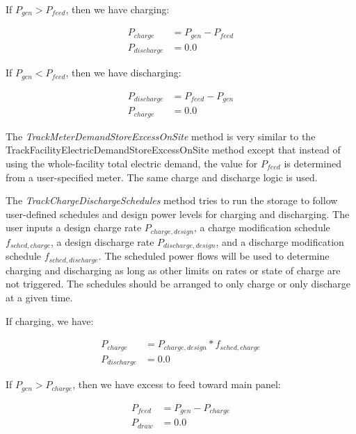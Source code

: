 If ${P_{gen}} > {P_{feed}}$,  then we have charging:

\begin{equation}
  \begin{array}{rl}
    {P_{charge}} &= {P_{gen}} - {P_{feed}} \\
    {P_{discharge}} &= 0.0
  \end{array}
\end{equation}

If ${P_{gen}} < {P_{feed}}$, then we have discharging:

\begin{equation}
  \begin{array}{rl}
    {P_{discharge}} &=  {P_{feed}} - {P_{gen}} \\
    {P_{charge}} &= 0.0
  \end{array}
\end{equation}

The \emph{TrackMeterDemandStoreExcessOnSite} method is very similar to the TrackFacilityElectricDemandStoreExcessOnSite method except that instead of using the whole-facility total electric demand, the value for ${P_{feed}}$ is determined from a user-specified meter.  The same charge and discharge logic is used.

The \emph{TrackChargeDischargeSchedules} method tries to run the storage to follow user-defined schedules and design power levels for charging and discharging.  The user inputs a design charge rate ${P_{charge,design}}$, a charge modification schedule ${f_{sched,charge}}$, a design discharge rate ${P_{discharge,design}}$, and a discharge modification schedule ${f_{sched,discharge}}$.  The scheduled power flows will be used to determine charging and discharging as long as other limits on rates or state of charge are not triggered.  The schedules should be arranged to only charge or only discharge at a given time.

If charging, we have:

\begin{equation}
  \begin{array}{rl}
    {P_{charge}} &= {P_{charge,design}} * {f_{sched,charge}} \\
    {P_{discharge}} &= 0.0
  \end{array}
\end{equation}

If ${P_{gen}} > {P_{charge}}$,  then we have excess to feed toward main panel:

\begin{equation}
  \begin{array}{rl}
    {P_{feed}} &= {P_{gen}} - {P_{charge}} \\
    {P_{draw}} &= 0.0
  \end{array}
\end{equation}

